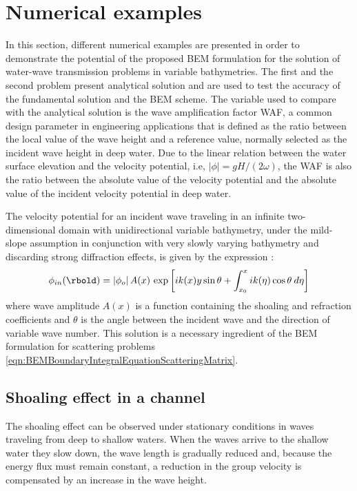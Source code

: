 \section{Numerical examples}
\label{SECTION:NUMERICAL EXAMPLES}
In this section, different numerical examples are presented in order to demonstrate the potential of the proposed BEM formulation for the solution of water-wave transmission problems in variable bathymetries. The first and the second problem present analytical solution and are used to test the accuracy of the fundamental solution and the BEM scheme. The variable used to compare with the analytical solution is the wave amplification factor WAF, a common design parameter in engineering applications that is defined as the ratio between the local value of the wave height and a reference value, normally selected as the incident wave height in deep water. Due to the linear relation between the water surface elevation and the velocity potential, i.e, $|\phi|=gH/(2\omega)$, the WAF is also the ratio between the absolute value of the velocity potential and the absolute value of the incident velocity potential in deep water.

The velocity potential for an incident wave traveling in an infinite two-dimensional domain with unidirectional variable bathymetry, under the mild-slope assumption in conjunction with very slowly varying bathymetry and discarding strong diffraction effects, is given by the expression \cite{PanchangChen2000}:
\begin{equation}
\label{eqn:NE Incident Wave}
\phi_{in}(\rbold)= \vert \phi_{o} \vert \, A(x) \, \exp{ \left[ ik(x)y \sin{\theta + \int_{x_0}^{x} ik(\eta) \cos\theta \: d\eta} \right]}
\end{equation} 
where wave amplitude $A(x)$ is a function containing the shoaling and refraction coefficients and $\theta$ is the angle between the incident wave and the direction of variable wave number. This solution is a necessary ingredient of the BEM formulation for scattering problems \eqref{eqn:BEMBoundaryIntegralEquationScatteringMatrix}.

\subsection{Shoaling effect in a channel}
\label{SUBSECTION: NM CANAL}
The shoaling effect can be observed under stationary conditions in waves traveling from deep to shallow waters. When the waves arrive to the shallow water they slow down, the wave length is gradually reduced and, because the energy flux must remain constant, a reduction in the group velocity is compensated by an increase in the wave height.

